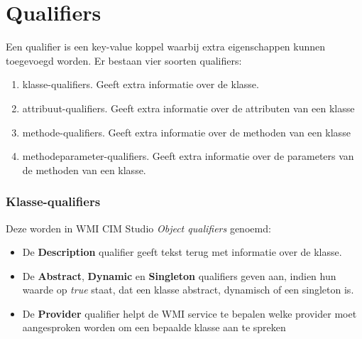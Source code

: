 \documentclass{report}
\begin{document}
	\section{Qualifiers}
	Een qualifier is een key-value koppel waarbij extra eigenschappen kunnen toegevoegd worden. Er bestaan vier soorten qualifiers:
	\begin{enumerate}
		\item klasse-qualifiers. Geeft extra informatie over de klasse. 
		\item attribuut-qualifiers. Geeft extra informatie over de attributen van een klasse
		\item methode-qualifiers. Geeft extra informatie over de methoden van een klasse
		\item methodeparameter-qualifiers. Geeft extra informatie over de parameters van de methoden van een klasse.
	\end{enumerate}
	\subsubsection{Klasse-qualifiers}
	Deze worden in WMI CIM Studio \textit{Object qualifiers} genoemd:
	\begin{itemize}
		\item De \textbf{Description} qualifier geeft tekst terug met informatie over de klasse.
		\item De \textbf{Abstract}, \textbf{Dynamic} en \textbf{Singleton} qualifiers geven aan, indien hun waarde op \textit{true} staat, dat een klasse abstract, dynamisch of een singleton is.
		\item De \textbf{Provider} qualifier helpt de WMI service te bepalen welke provider moet aangesproken worden om een bepaalde klasse aan te spreken
	\end{itemize}
\end{document}
